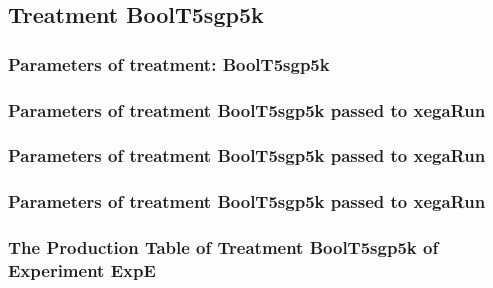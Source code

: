 \documentclass[18pt,c]{beamer}
\makeatletter
\def\beamer@writeslidentry@miniframesoff{%
  \expandafter\beamer@ifempty\expandafter{\beamer@framestartpage}{}%
  {%
   \clearpage\beamer@notesactions%
  }
}
\newcommand*{\miniframesoff}{\let\beamer@writeslidentry=\beamer@writeslidentry@miniframesoff}
\makeatother
\begin{document}
\miniframesoff
\subsection{Treatment BoolT5sgp5k}

 \begin{frame}
 \fontsize{8pt}{9pt}\selectfont
 \frametitle{  Parameters of treatment: BoolT5sgp5k 
 }

 \label{ExpEtParmTable032.tex}  
 \end{frame}


 \begin{frame}
 \fontsize{8pt}{9pt}\selectfont
 \frametitle{  Parameters of treatment BoolT5sgp5k passed to xegaRun
 }

 \label{ExpEtParmTable033.tex}  
 \end{frame}


 \begin{frame}
 \fontsize{8pt}{9pt}\selectfont
 \frametitle{  Parameters of treatment BoolT5sgp5k passed to xegaRun
 }

 \label{ExpEtParmTable034.tex}  
 \end{frame}


 \begin{frame}
 \fontsize{8pt}{9pt}\selectfont
 \frametitle{  Parameters of treatment BoolT5sgp5k passed to xegaRun
 }

 \label{ExpEtParmTable035.tex}  
 \end{frame}

 \begin{frame}
 \fontsize{8pt}{9pt}\selectfont
 \frametitle{ The Production Table of Treatment BoolT5sgp5k of Experiment ExpE }

 \label{ExpEGrammarTable011.tex}  
 \end{frame}
\end{document}
